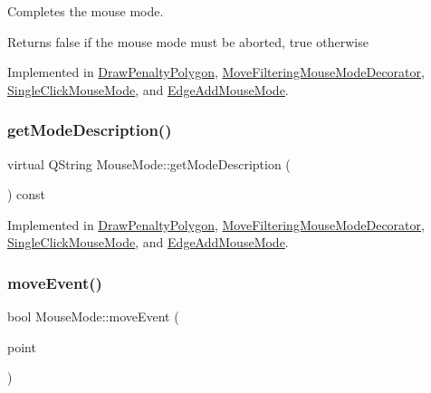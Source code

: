 Completes the mouse mode. 

\begin{DoxyReturn}{Returns}
false if the mouse mode must be aborted, true otherwise 
\end{DoxyReturn}


Implemented in \mbox{\hyperlink{class_draw_penalty_polygon_acf00ec45918544a8a33adc4582270c06}{Draw\+Penalty\+Polygon}}, \mbox{\hyperlink{class_move_filtering_mouse_mode_decorator_a3986dc8532f8e483444c875d5e050c3b}{Move\+Filtering\+Mouse\+Mode\+Decorator}}, \mbox{\hyperlink{class_single_click_mouse_mode_a37735155f310a47896f8a0459da0f6e7}{Single\+Click\+Mouse\+Mode}}, and \mbox{\hyperlink{class_edge_add_mouse_mode_aa78402058c8efd76035be5f22109899d}{Edge\+Add\+Mouse\+Mode}}.

\mbox{\label{class_mouse_mode_aa442d3058243efe81e8052a137c2072e}} 
\subsubsection{\texorpdfstring{getModeDescription()}{getModeDescription()}}
{\footnotesize\ttfamily virtual Q\+String Mouse\+Mode\+::get\+Mode\+Description (\begin{DoxyParamCaption}{ }\end{DoxyParamCaption}) const\hspace{0.3cm}{\ttfamily [pure virtual]}}



Implemented in \mbox{\hyperlink{class_draw_penalty_polygon_a55173a612268b53b34585ef0b2505ac0}{Draw\+Penalty\+Polygon}}, \mbox{\hyperlink{class_move_filtering_mouse_mode_decorator_ae66c9e6988302358b19aa7c8259edbdd}{Move\+Filtering\+Mouse\+Mode\+Decorator}}, \mbox{\hyperlink{class_single_click_mouse_mode_a135c1060f9c167ea441c9b257bd1fbc3}{Single\+Click\+Mouse\+Mode}}, and \mbox{\hyperlink{class_edge_add_mouse_mode_a1066045f847ba4ccfcd23d525b86c72b}{Edge\+Add\+Mouse\+Mode}}.

\mbox{\label{class_mouse_mode_adb2e2afbb2ac1793a665f1d227e12ce6}} 
\subsubsection{\texorpdfstring{moveEvent()}{moveEvent()}}
{\footnotesize\ttfamily bool Mouse\+Mode\+::move\+Event (\begin{DoxyParamCaption}\item[{const Q\+PointF \&}]{point }\end{DoxyParamCaption})\hspace{0.3cm}{\ttfamily [virtual]}}



